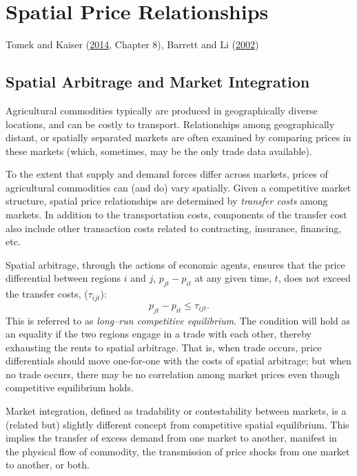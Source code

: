 \documentclass[
]{book}
\begin{document}
\hypertarget{spatial-price-relationships}{%
\chapter{Spatial Price Relationships}\label{spatial-price-relationships}}

Tomek and Kaiser (\protect\hyperlink{ref-tomek2014}{2014}, Chapter 8), Barrett and Li (\protect\hyperlink{ref-barrett2002}{2002})

\hypertarget{spatial-arbitrage-and-market-integration}{%
\section{Spatial Arbitrage and Market Integration}\label{spatial-arbitrage-and-market-integration}}

Agricultural commodities typically are produced in geographically diverse locations, and can be costly to transport. Relationships among geographically distant, or spatially separated markets are often examined by comparing prices in these markets (which, sometimes, may be the only trade data available).

To the extent that supply and demand forces differ across markets, prices of agricultural commodities can (and do) vary spatially. Given a competitive market structure, spatial price relationships are determined by \emph{transfer costs} among markets. In addition to the transportation costs, components of the transfer cost also include other transaction costs related to contracting, insurance, financing, etc.

Spatial arbitrage, through the actions of economic agents, ensures that the price differential between regions \(i\) and \(j\), \(p_{jt}-p_{it}\) at any given time, \(t\), does not exceed the transfer costs, (\(\tau_{ijt}\)): \[p_{jt}-p_{it} \le \tau_{ijt}.\] This is referred to as \emph{long--run competitive equilibrium}. The condition will hold as an equality if the two regions engage in a trade with each other, thereby exhausting the rents to spatial arbitrage. That is, when trade occurs, price differentials should move one-for-one with the costs of spatial arbitrage; but when no trade occurs, there may be no correlation among market prices even though competitive equilibrium holds.

Market integration, defined as tradability or contestability between markets, is a (related but) slightly different concept from competitive spatial equilibrium. This implies the transfer of excess demand from one market to another, manifest
in the physical flow of commodity, the transmission of price shocks from one market to another, or both.
\end{document}
